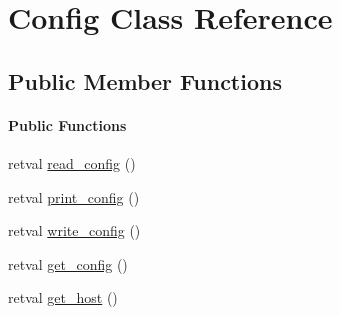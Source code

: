 \hypertarget{class_d_jabberd_1_1_config_1_1_config}{
\section{\-Config \-Class \-Reference}
\label{class_d_jabberd_1_1_config_1_1_config}
}
\subsection*{\-Public \-Member \-Functions}
\begin{Indent}\paragraph*{\-Public \-Functions}
\begin{DoxyCompactItemize}
\item 
retval \hyperlink{class_d_jabberd_1_1_config_1_1_config_a1b871dff0e591ecb7c6da2d3fcdf6732}{read\-\_\-config} ()
\item 
retval \hyperlink{class_d_jabberd_1_1_config_1_1_config_a270d4d2ebfa6d000081c8c5e77adc319}{print\-\_\-config} ()
\item 
retval \hyperlink{class_d_jabberd_1_1_config_1_1_config_a0b18e3894fbb8dc457c26b525c43446a}{write\-\_\-config} ()
\item 
retval \hyperlink{class_d_jabberd_1_1_config_1_1_config_afdf2cd254feafacbb54e83675a771e1c}{get\-\_\-config} ()
\item 
retval \hyperlink{class_d_jabberd_1_1_config_1_1_config_a2f1ef1996fc2424516c383555c66caee}{get\-\_\-host} ()
\end{DoxyCompactItemize}
\end{Indent}



